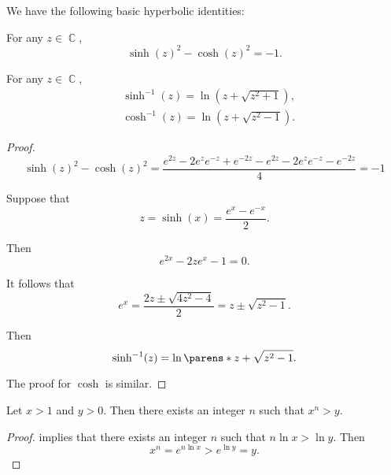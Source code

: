 \begin{proposition}\label{thm:hyperbolic_identities}
  We have the following basic hyperbolic identities:
  \begin{thmenum}
     For any \( z \in \BbbC \),
    \begin{equation}\label{eq:thm:hyperbolic_identities/pythagorean_identity}
      \sinh(z)^2 - \cosh(z)^2 = -1.
    \end{equation}

     For any \( z \in \BbbC \),
    \begin{align}
      &\sinh^{-1}(z) = \ln(z + \sqrt{ z^2 + 1 }), \label{eq:thm:hyperbolic_identities/inverse/sinh} \\
      &\cosh^{-1}(z) = \ln(z + \sqrt{ z^2 - 1 }). \label{eq:thm:hyperbolic_identities/inverse/cosh}
    \end{align}
  \end{thmenum}
\end{proposition}
\begin{proof}
  \begin{equation*}
    \sinh(z)^2 - \cosh(z)^2
    =
    \frac {e^{2z} - 2e^z e^{-z} + e^{-2z} - e^{2z} - 2e^z e^{-z} - e^{-2z}} 4
    =
    -1
  \end{equation*}

   Suppose that
  \begin{equation*}
    z = \sinh(x) = \frac {e^x - e^{-x}} 2.
  \end{equation*}

  Then
  \begin{equation*}
    e^{2x} - 2z e^x - 1 = 0.
  \end{equation*}

  It follows that
  \begin{equation*}
    e^x = \frac {2z \pm \sqrt{ 4z^2 - 4 }} 2 = z \pm \sqrt{ z^2 - 1 }.
  \end{equation*}

  Then
  \begin{equation*}
    \sinh^{-1}(z) = \ln\parens*{ z + \sqrt{ z^2 - 1 } }.
  \end{equation*}

  The proof for \( \cosh \) is similar.
\end{proof}

\begin{proposition}\label{thm:exp_archimedean}
  Let \( x > 1 \) and \( y > 0 \). Then there exists an integer \( n \) such that \( x^n > y \).
\end{proposition}
\begin{proof}
   implies that there exists an integer \( n \) such that \( n \ln x > \ln y \). Then
  \begin{equation*}
    x^n = e^{n \ln x} > e^{\ln y} = y.
  \end{equation*}
\end{proof}
